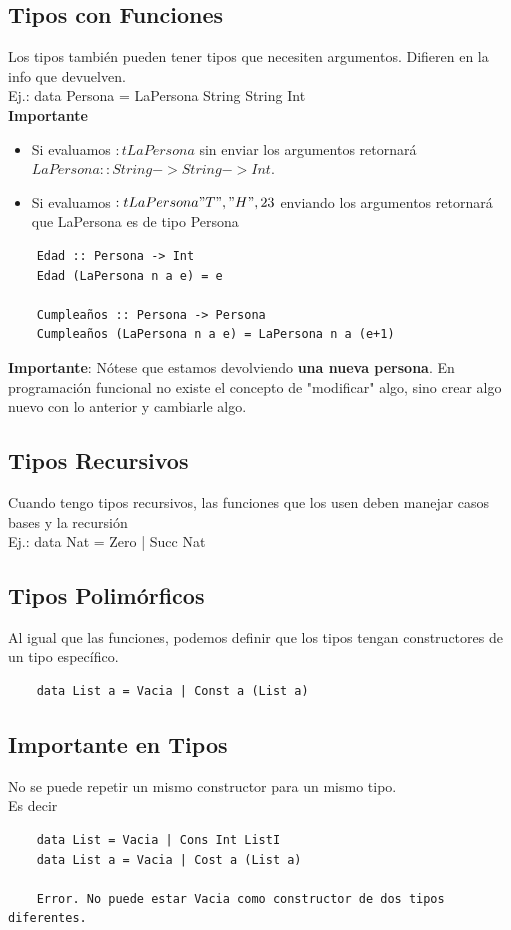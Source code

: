 \documentclass[10pt,a4paper]{article}
\begin{document}
\subsection*{Tipos con Funciones}
Los tipos también pueden tener tipos que necesiten argumentos. Difieren en la info que devuelven. \\
Ej.: data Persona = LaPersona String String Int \\
\textbf{Importante}
\begin{itemize}
    \item Si evaluamos $:t LaPersona$ sin enviar los argumentos retornará $LaPersona :: String -> String -> Int$. 
    \item Si evaluamos $:t LaPersona "T", "H", 23$ enviando los argumentos retornará que LaPersona es de tipo Persona
\end{itemize}
\begin{lstlisting}
    Edad :: Persona -> Int 
    Edad (LaPersona n a e) = e

    Cumpleaños :: Persona -> Persona 
    Cumpleaños (LaPersona n a e) = LaPersona n a (e+1)
\end{lstlisting}
\textbf{Importante}: Nótese que estamos devolviendo \textbf{una nueva persona}. En programación funcional no existe el concepto de "modificar" algo, sino crear algo nuevo con lo anterior y cambiarle algo.
\subsection*{Tipos Recursivos}
Cuando tengo tipos recursivos, las funciones que los usen deben manejar casos bases y la recursión \\
Ej.: data Nat = Zero | Succ Nat \\
\subsection*{Tipos Polimórficos} 
Al igual que las funciones, podemos definir que los tipos tengan constructores de un tipo específico.
\begin{lstlisting}
    data List a = Vacia | Const a (List a)
\end{lstlisting}
\subsection*{Importante en Tipos}
No se puede repetir un mismo constructor para un mismo tipo. \\
Es decir
\begin{lstlisting}
    data List = Vacia | Cons Int ListI 
    data List a = Vacia | Cost a (List a)

    Error. No puede estar Vacia como constructor de dos tipos diferentes.
\end{lstlisting}
\end{document}
